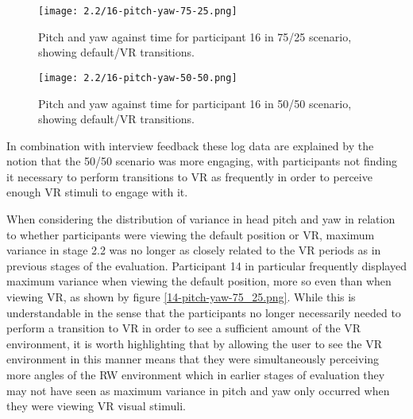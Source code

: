 \begin{figure}[h]
	\begin{center}
	\texttt{[image: 2.2/16-pitch-yaw-75-25.png]}
	\caption{Pitch and yaw against time for participant 16 in 75/25 scenario, showing default/VR transitions.}
	\label{16-pitch-yaw-75-25.png}
	\end{center}
\end{figure}

\begin{figure}[h]
	\begin{center}
	\texttt{[image: 2.2/16-pitch-yaw-50-50.png]}
	\caption{Pitch and yaw against time for participant 16 in 50/50 scenario, showing default/VR transitions.}
	\label{16-pitch-yaw-50-50.png}
	\end{center}
\end{figure}

In combination with interview feedback these log data are explained by the notion that the 50/50 scenario was more engaging, with participants not finding it necessary to perform transitions to VR as frequently in order to perceive enough VR stimuli to engage with it.

\newpage

When considering the distribution of variance in head pitch and yaw in relation to whether participants were viewing the default position or VR, maximum variance in stage 2.2 was no longer as closely related to the VR periods as in previous stages of the evaluation. Participant 14 in particular frequently displayed maximum variance when viewing the default position, more so even than when viewing VR, as shown by figure \ref{14-pitch-yaw-75_25.png}. While this is understandable in the sense that the participants no longer necessarily needed to perform a transition to VR in order to see a sufficient amount of the VR environment, it is worth highlighting that by allowing the user to see the VR environment in this manner means that they were simultaneously perceiving more angles of the RW environment which in earlier stages of evaluation they may not have seen as maximum variance in pitch and yaw only occurred when they were viewing VR visual stimuli.

\vspace{1.5cm}

